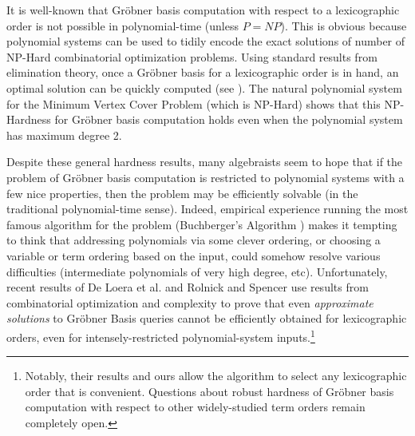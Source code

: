 \documentclass{article}
\begin{document}
It is well-known that Gr\"{o}bner basis computation with respect to a lexicographic order is not possible in polynomial-time (unless $P=NP$).  This is obvious because polynomial systems can be used to tidily encode the exact solutions of number of NP-Hard combinatorial optimization problems. Using standard results from elimination theory, once a Gr\"{o}bner basis for a lexicographic order is in hand, an optimal solution can be quickly computed (see \citep{Cox}). The natural polynomial system for the Minimum Vertex Cover Problem (which is NP-Hard) shows that this NP-Hardness for Gr\"{o}bner basis computation holds even when the polynomial system has maximum degree 2.

Despite these general hardness results, many algebraists seem to hope that if the problem of Gr\"{o}bner basis computation is restricted to polynomial systems with a few nice properties, then the problem may be efficiently solvable (in the traditional polynomial-time sense). Indeed, empirical experience running the most famous algorithm for the problem (Buchberger's Algorithm \cite{buch}) makes it tempting to think that addressing polynomials via some clever ordering, or choosing a variable or term ordering based on the input, could somehow resolve various difficulties (intermediate polynomials of very high degree, etc). Unfortunately, recent results of De Loera et al. \cite{deloera} and Rolnick and Spencer \cite{RS} use results from combinatorial optimization and complexity to prove that even \textit{approximate solutions} to Gr\"{o}bner Basis queries cannot be efficiently obtained for lexicographic orders, even for intensely-restricted polynomial-system inputs.\footnote{Notably, their results and ours allow the algorithm to select any lexicographic order that is convenient. Questions about robust hardness of Gr\"{o}bner basis computation with respect to other widely-studied term orders remain completely open.}
\end{document}
